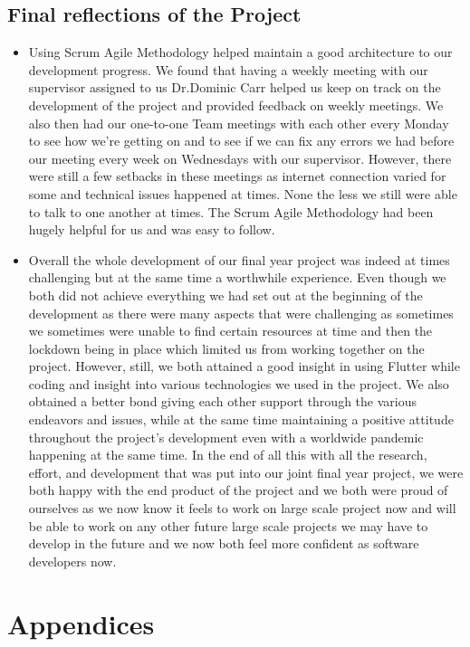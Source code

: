 \section{Final reflections of the Project}
\begin{itemize}
    \item Using Scrum Agile Methodology helped maintain a good architecture to our development progress. We found that having a weekly meeting with our supervisor assigned to us Dr.Dominic Carr helped us keep on track on the development of the project and provided feedback on weekly meetings. We also then had our one-to-one Team meetings with each other every Monday to see how we're getting on and to see if we can fix any errors we had before our meeting every week on Wednesdays with our supervisor. However, there were still a few setbacks in these meetings as internet connection varied for some and technical issues happened at times. None the less we still were able to talk to one another at times. The Scrum Agile Methodology had been hugely helpful for us and was easy to follow.
    \item Overall the whole development of our final year project was indeed at times challenging but at the same time a worthwhile experience. Even though we both did not achieve everything we had set out at the beginning of the development as there were many aspects that were challenging as sometimes we sometimes were unable to find certain resources at time and then the lockdown being in place which limited us from working together on the project. However, still, we both attained a good insight in using Flutter while coding and insight into various technologies we used in the project. We also obtained a better bond giving each other support through the various endeavors and issues, while at the same time maintaining a positive attitude throughout the project's development even with a worldwide pandemic happening at the same time. In the end of all this with all the research, effort, and development that was put into our joint final year project, we were both happy with the end product of the project and we both were proud of ourselves as we now know it feels to work on large scale project now and will be able to work on any other future large scale projects we may have to develop in the future and we now both feel more confident as software developers now.
\end{itemize}
\chapter{Appendices}
